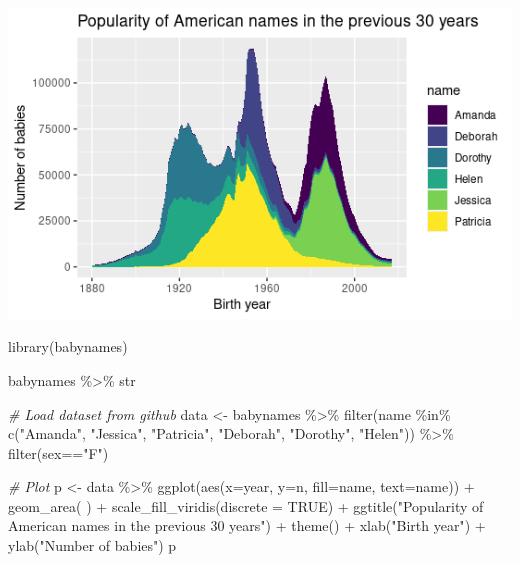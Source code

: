 \documentclass[
]{book}
\newenvironment{Shaded}{\begin{snugshade}}{\end{snugshade}}
\newcommand{\AttributeTok}[1]{\textcolor[rgb]{0.77,0.63,0.00}{#1}}
\newcommand{\CommentTok}[1]{\textcolor[rgb]{0.56,0.35,0.01}{\textit{#1}}}
\newcommand{\ConstantTok}[1]{\textcolor[rgb]{0.00,0.00,0.00}{#1}}
\newcommand{\FunctionTok}[1]{\textcolor[rgb]{0.00,0.00,0.00}{#1}}
\newcommand{\NormalTok}[1]{#1}
\newcommand{\OtherTok}[1]{\textcolor[rgb]{0.56,0.35,0.01}{#1}}
\newcommand{\SpecialCharTok}[1]{\textcolor[rgb]{0.00,0.00,0.00}{#1}}
\newcommand{\StringTok}[1]{\textcolor[rgb]{0.31,0.60,0.02}{#1}}
\begin{document}
\includegraphics{images/10/000009a.png}

\begin{Shaded}
\begin{Highlighting}[]
\FunctionTok{library}\NormalTok{(babynames)}

\NormalTok{babynames }\SpecialCharTok{\%\textgreater{}\%}\NormalTok{ str}


\CommentTok{\# Load dataset from github}
\NormalTok{data }\OtherTok{\textless{}{-}}\NormalTok{ babynames }\SpecialCharTok{\%\textgreater{}\%} 
  \FunctionTok{filter}\NormalTok{(name }\SpecialCharTok{\%in\%} \FunctionTok{c}\NormalTok{(}\StringTok{"Amanda"}\NormalTok{, }\StringTok{"Jessica"}\NormalTok{,    }\StringTok{"Patricia"}\NormalTok{, }\StringTok{"Deborah"}\NormalTok{,   }\StringTok{"Dorothy"}\NormalTok{,  }\StringTok{"Helen"}\NormalTok{)) }\SpecialCharTok{\%\textgreater{}\%}
  \FunctionTok{filter}\NormalTok{(sex}\SpecialCharTok{==}\StringTok{"F"}\NormalTok{)}

\CommentTok{\# Plot}
\NormalTok{p }\OtherTok{\textless{}{-}}\NormalTok{ data }\SpecialCharTok{\%\textgreater{}\%} 
  \FunctionTok{ggplot}\NormalTok{(}\FunctionTok{aes}\NormalTok{(}\AttributeTok{x=}\NormalTok{year, }\AttributeTok{y=}\NormalTok{n, }\AttributeTok{fill=}\NormalTok{name, }\AttributeTok{text=}\NormalTok{name)) }\SpecialCharTok{+}
    \FunctionTok{geom\_area}\NormalTok{( ) }\SpecialCharTok{+}
    \FunctionTok{scale\_fill\_viridis}\NormalTok{(}\AttributeTok{discrete =} \ConstantTok{TRUE}\NormalTok{) }\SpecialCharTok{+}
    \FunctionTok{ggtitle}\NormalTok{(}\StringTok{"Popularity of American names in the previous 30 years"}\NormalTok{) }\SpecialCharTok{+}
    \FunctionTok{theme}\NormalTok{() }\SpecialCharTok{+}
    \FunctionTok{xlab}\NormalTok{(}\StringTok{"Birth year"}\NormalTok{) }\SpecialCharTok{+}
    \FunctionTok{ylab}\NormalTok{(}\StringTok{"Number of babies"}\NormalTok{)}
\NormalTok{p}
\end{Highlighting}
\end{Shaded}
\end{document}
